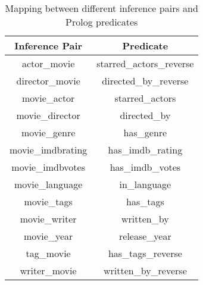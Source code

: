 \documentclass[11pt]{article}
\begin{document}
\begin{table}[H]

\begin{center}
\begin{tabular}{|c|c|}
\hline
\textbf{Inference Pair}             & \textbf{Predicate}                        \\ \hline
actor\_movie                        & starred\_actors\_reverse                  \\ \hline
director\_movie                     & directed\_by\_reverse                     \\ \hline
movie\_actor                        & starred\_actors                           \\ \hline
movie\_director                     & directed\_by                              \\ \hline
movie\_genre                        & has\_genre                                \\ \hline
movie\_imdbrating                   & has\_imdb\_rating                         \\ \hline
movie\_imdbvotes                    & has\_imdb\_votes                          \\ \hline
movie\_language                     & in\_language                              \\ \hline
movie\_tags                         & has\_tags                                 \\ \hline
movie\_writer                       & written\_by                               \\ \hline
movie\_year                         & release\_year                             \\ \hline
{tag\_movie}    &  {has\_tags\_reverse}   \\ \hline
{writer\_movie} & {written\_by\_reverse} \\ \hline
\end{tabular}
\end{center}
\caption{Mapping between different inference pairs and Prolog predicates}
\label{tab:mapping}

\end{table}
\end{document}
